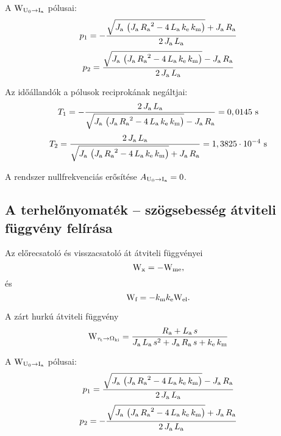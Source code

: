 A $\mathrm{W}_{\mathrm{U}_0\rightarrow \mathrm{I}_\text{a}}$ pólusai:
\begin{equation}
	p_1 = -\frac{\sqrt{J_\text{a}\, \left(J_\text{a}\, {R_\text{a}}^2 - 4\, L_\text{a}\, k_\text{e}\, k_\text{m}\right)} + J_\text{a}\, R_\text{a}}{2\, J_\text{a}\, L_\text{a}}
\end{equation}
\begin{equation}
	p_2 = \frac{\sqrt{J_\text{a}\, \left(J_\text{a}\, {R_\text{a}}^2 - 4\, L_\text{a}\, k_\text{e}\, k_\text{m}\right)} - J_\text{a}\, R_\text{a}}{2\, J_\text{a}\, L_\text{a}}
\end{equation}

Az időállandók a pólusok reciprokának negáltjai:
\begin{equation}
	T_1 = -\frac{2\, J_\text{a}\, L_\text{a}}{\sqrt{J_\text{a}\, \left(J_\text{a}\, {R_\text{a}}^2 - 4\, L_\text{a}\, k_\text{e}\, k_\text{m}\right)} - J_\text{a}\, R_\text{a}} = 0,0145\text{ s}
\end{equation}
\begin{equation}
	T_2 = \frac{2\, J_\text{a}\, L_\text{a}}{\sqrt{J_\text{a}\, \left(J_\text{a}\, {R_\text{a}}^2 - 4\, L_\text{a}\, k_\text{e}\, k_\text{m}\right)} + J_\text{a}\, R_\text{a}} = 1,3825\cdot 10^{-4}\text{ s}
\end{equation}

A rendszer nullfrekvenciás erősítése $A_{\mathrm{U}_0\rightarrow \mathrm{I}_\text{a}} = 0$.


\subsection{A terhelőnyomaték -- szögsebesség átviteli függvény felírása}
\label{subsect:Wt-w}

Az előrecsatoló és visszacsatoló át átviteli függvényei
\begin{equation}
	\mathrm{W}_\text{x} = -\mathrm{W}_\text{me},
\end{equation} és 
\begin{equation}
	\mathrm{W}_\text{f} = -k_\text{m}k_\text{e}\mathrm{W}_\text{el}.
\end{equation}

A zárt hurkú átviteli függvény
\begin{equation}
	\mathrm{W}_{\tau_\text{t}\rightarrow\Omega_\text{ki}} = 
	\frac{R_\text{a} + L_\text{a}\, s}{J_\text{a}\, L_\text{a}\, s^2 + J_\text{a}\, R_\text{a}\, s + k_\text{e}\, k_\text{m}}
\end{equation}

A $\mathrm{W}_{\mathrm{U}_0\rightarrow \mathrm{I}_\text{a}}$ pólusai:
\begin{equation}
	p_1 = \frac{\sqrt{J_\text{a}\, \left(J_\text{a}\, {R_\text{a}}^2 - 4\, L_\text{a}\, k_\text{e}\, k_\text{m}\right)} - J_\text{a}\, R_\text{a}}{2\, J_\text{a}\, L_\text{a}}
\end{equation}
\begin{equation}
	p_2 = -\frac{\sqrt{J_\text{a}\, \left(J_\text{a}\, {R_\text{a}}^2 - 4\, L_\text{a}\, k_\text{e}\, k_\text{m}\right)} + J_\text{a}\, R_\text{a}}{2\, J_\text{a}\, L_\text{a}}
\end{equation}

